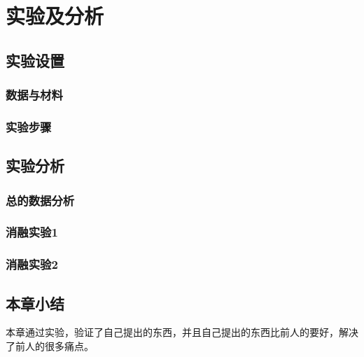 
\chapter{实验及分析}

\section{实验设置}

\subsection{数据与材料}

\subsection{实验步骤}

\section{实验分析}

\subsection{总的数据分析}

\subsection{消融实验1}

\subsection{消融实验2}

\section{本章小结}

本章通过实验，验证了自己提出的东西，并且自己提出的东西比前人的要好，解决了前人的很多痛点。